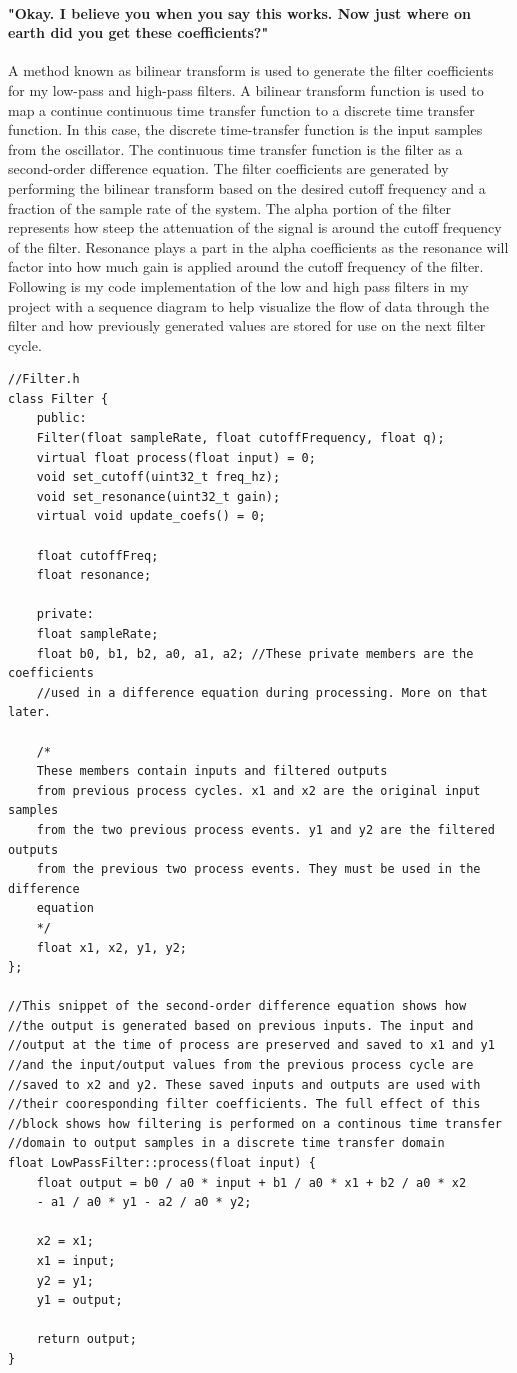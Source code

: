 \documentclass[acmlarge,screen]{acmart}
\begin{document}
	\paragraph{"Okay. I believe you when you say this works. Now just where on earth did you get these coefficients?"} A method known as bilinear transform is used to generate the filter coefficients for my low-pass and high-pass filters. A bilinear transform function is used to map a continue continuous time transfer function to a discrete time transfer function. In this case, the discrete time-transfer function is the input samples from the oscillator. The continuous time transfer function is the filter as a second-order difference equation. The filter coefficients are generated by performing the bilinear transform based on the desired cutoff frequency and a fraction of the sample rate of the system.\cite{stanford_2007} The alpha portion of the filter represents how steep the attenuation of the signal is around the cutoff frequency of the filter. Resonance plays a part in the alpha coefficients as the resonance will factor into how much gain is applied around the cutoff frequency of the filter. Following is my code implementation of the low and high pass filters in my project with a sequence diagram to help visualize the flow of data through the filter and how previously generated values are stored for use on the next filter cycle.
	
	\begin{verbatim}
//Filter.h
class Filter {
	public:
	Filter(float sampleRate, float cutoffFrequency, float q);
	virtual float process(float input) = 0;
	void set_cutoff(uint32_t freq_hz);
	void set_resonance(uint32_t gain);
	virtual void update_coefs() = 0;
	
	float cutoffFreq;
	float resonance;
	
	private:
	float sampleRate;
	float b0, b1, b2, a0, a1, a2; //These private members are the coefficients
	//used in a difference equation during processing. More on that later.
	
	/*
	These members contain inputs and filtered outputs
	from previous process cycles. x1 and x2 are the original input samples
	from the two previous process events. y1 and y2 are the filtered outputs
	from the previous two process events. They must be used in the difference
	equation
	*/
	float x1, x2, y1, y2;
};

//This snippet of the second-order difference equation shows how
//the output is generated based on previous inputs. The input and
//output at the time of process are preserved and saved to x1 and y1
//and the input/output values from the previous process cycle are
//saved to x2 and y2. These saved inputs and outputs are used with
//their cooresponding filter coefficients. The full effect of this
//block shows how filtering is performed on a continous time transfer
//domain to output samples in a discrete time transfer domain
float LowPassFilter::process(float input) {
	float output = b0 / a0 * input + b1 / a0 * x1 + b2 / a0 * x2
	- a1 / a0 * y1 - a2 / a0 * y2;
	
	x2 = x1;
	x1 = input;
	y2 = y1;
	y1 = output;
	
	return output;
}
	\end{verbatim}
	
\end{document}
